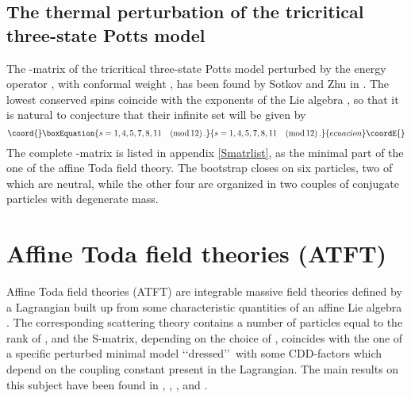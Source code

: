 \documentclass[a4paper,12pt]{report}
\begin{document}
\subsection{The thermal perturbation of the tricritical three-state Potts model}

The \coordHE{}-matrix of the tricritical three-state Potts model perturbed by the energy operator
\coordHE{}, with conformal weight \coordHE{}, has been
found by Sotkov and Zhu in \cite{E6}. The lowest conserved spins coincide with the exponents of the Lie algebra
\coordHE{}, so that it is natural to conjecture that their infinite set will be given by
\begin{equation}\coord{}\boxEquation{
s=1,4,5,7,8,11 \quad (\textrm{mod}\, 12)\,.
}{
s=1,4,5,7,8,11 \quad (\textrm{mod}\, 12)\,.
}{ecuacion}\coordE{}\end{equation}
The complete \coordHE{}-matrix is listed in appendix \ref{Smatrlist}, as the minimal part of the one of the \coordHE{}
affine Toda field theory. The bootstrap closes on six particles, two of which are neutral, while the other four
are organized in two couples \coordHE{} of conjugate particles with degenerate mass.




\vspace{1cm}

\section{Affine Toda field theories (ATFT)} \label{Toda}

Affine Toda field theories (ATFT) are integrable massive field theories defined by a Lagrangian built up from some
characteristic quantities of an affine Lie algebra \coordHE{}. The corresponding scattering theory contains a
number of particles equal to the rank of \coordHE{}, and the S-matrix, depending on the choice of \coordHE{},
coincides with the one of a specific perturbed minimal model \lq\lq dressed\rq\rq \, with some CDD-factors which
depend on the coupling constant present in the Lagrangian. The main results on this subject have been found in
\cite{arfatzam}, \cite{chrmuss1}, \cite{chrmuss2}, \cite{dur1} and \cite{dur2}.
\end{document}
